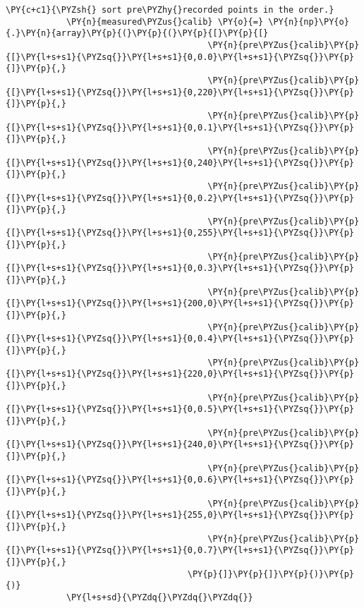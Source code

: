 \begin{Verbatim}[commandchars=\\\{\}]
            \PY{c+c1}{\PYZsh{} sort pre\PYZhy{}recorded points in the order.}
            \PY{n}{measured\PYZus{}calib} \PY{o}{=} \PY{n}{np}\PY{o}{.}\PY{n}{array}\PY{p}{(}\PY{p}{(}\PY{p}{[}\PY{p}{[}
                                        \PY{n}{pre\PYZus{}calib}\PY{p}{[}\PY{l+s+s1}{\PYZsq{}}\PY{l+s+s1}{0,0.0}\PY{l+s+s1}{\PYZsq{}}\PY{p}{]}\PY{p}{,}
                                        \PY{n}{pre\PYZus{}calib}\PY{p}{[}\PY{l+s+s1}{\PYZsq{}}\PY{l+s+s1}{0,220}\PY{l+s+s1}{\PYZsq{}}\PY{p}{]}\PY{p}{,}
                                        \PY{n}{pre\PYZus{}calib}\PY{p}{[}\PY{l+s+s1}{\PYZsq{}}\PY{l+s+s1}{0,0.1}\PY{l+s+s1}{\PYZsq{}}\PY{p}{]}\PY{p}{,}
                                        \PY{n}{pre\PYZus{}calib}\PY{p}{[}\PY{l+s+s1}{\PYZsq{}}\PY{l+s+s1}{0,240}\PY{l+s+s1}{\PYZsq{}}\PY{p}{]}\PY{p}{,}
                                        \PY{n}{pre\PYZus{}calib}\PY{p}{[}\PY{l+s+s1}{\PYZsq{}}\PY{l+s+s1}{0,0.2}\PY{l+s+s1}{\PYZsq{}}\PY{p}{]}\PY{p}{,}
                                        \PY{n}{pre\PYZus{}calib}\PY{p}{[}\PY{l+s+s1}{\PYZsq{}}\PY{l+s+s1}{0,255}\PY{l+s+s1}{\PYZsq{}}\PY{p}{]}\PY{p}{,}
                                        \PY{n}{pre\PYZus{}calib}\PY{p}{[}\PY{l+s+s1}{\PYZsq{}}\PY{l+s+s1}{0,0.3}\PY{l+s+s1}{\PYZsq{}}\PY{p}{]}\PY{p}{,}
                                        \PY{n}{pre\PYZus{}calib}\PY{p}{[}\PY{l+s+s1}{\PYZsq{}}\PY{l+s+s1}{200,0}\PY{l+s+s1}{\PYZsq{}}\PY{p}{]}\PY{p}{,}
                                        \PY{n}{pre\PYZus{}calib}\PY{p}{[}\PY{l+s+s1}{\PYZsq{}}\PY{l+s+s1}{0,0.4}\PY{l+s+s1}{\PYZsq{}}\PY{p}{]}\PY{p}{,}
                                        \PY{n}{pre\PYZus{}calib}\PY{p}{[}\PY{l+s+s1}{\PYZsq{}}\PY{l+s+s1}{220,0}\PY{l+s+s1}{\PYZsq{}}\PY{p}{]}\PY{p}{,}
                                        \PY{n}{pre\PYZus{}calib}\PY{p}{[}\PY{l+s+s1}{\PYZsq{}}\PY{l+s+s1}{0,0.5}\PY{l+s+s1}{\PYZsq{}}\PY{p}{]}\PY{p}{,}
                                        \PY{n}{pre\PYZus{}calib}\PY{p}{[}\PY{l+s+s1}{\PYZsq{}}\PY{l+s+s1}{240,0}\PY{l+s+s1}{\PYZsq{}}\PY{p}{]}\PY{p}{,}
                                        \PY{n}{pre\PYZus{}calib}\PY{p}{[}\PY{l+s+s1}{\PYZsq{}}\PY{l+s+s1}{0,0.6}\PY{l+s+s1}{\PYZsq{}}\PY{p}{]}\PY{p}{,}
                                        \PY{n}{pre\PYZus{}calib}\PY{p}{[}\PY{l+s+s1}{\PYZsq{}}\PY{l+s+s1}{255,0}\PY{l+s+s1}{\PYZsq{}}\PY{p}{]}\PY{p}{,}
                                        \PY{n}{pre\PYZus{}calib}\PY{p}{[}\PY{l+s+s1}{\PYZsq{}}\PY{l+s+s1}{0,0.7}\PY{l+s+s1}{\PYZsq{}}\PY{p}{]}\PY{p}{,}
                                    \PY{p}{]}\PY{p}{]}\PY{p}{)}\PY{p}{)}
            \PY{l+s+sd}{\PYZdq{}\PYZdq{}\PYZdq{}}

\end{Verbatim}
